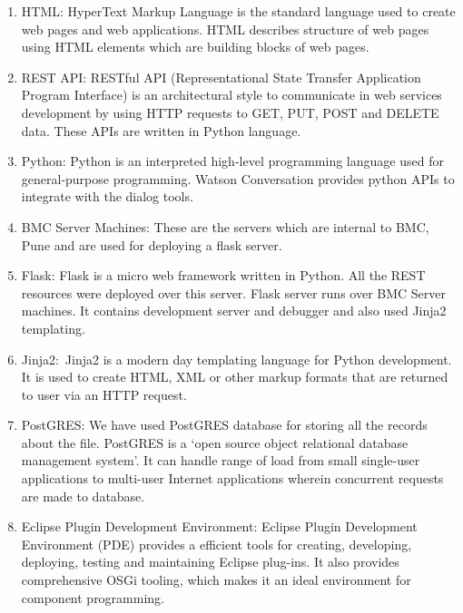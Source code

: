 \documentclass[oneside,a4paper,12pt]{book}
\begin{document}
\begin{enumerate}
	\item HTML: HyperText Markup Language is the standard language used to create web pages and web applications. HTML describes structure of web pages using HTML elements which are building blocks of web pages.\par

	\item REST API: RESTful API (Representational State Transfer Application Program Interface) is an architectural style to communicate in web services development by using HTTP requests to GET, PUT, POST and DELETE data. These APIs are written in Python language.\par

	\item Python: Python is an interpreted high-level programming language used for general-purpose programming. Watson Conversation provides python APIs to integrate with the dialog tools.\par

	\item BMC Server Machines: These are the servers which are internal to BMC, Pune and are used for deploying a flask server.\par

	\item Flask: Flask is a micro web framework written in Python. All the REST resources were deployed over this server. Flask server runs over BMC Server machines. It contains development server and debugger and also used Jinja2 templating.\par

	\item Jinja2:\ Jinja2 is a modern day templating language for Python development.  It is used to create HTML, XML or other markup formats that are returned to user via an HTTP request. \par

	\item PostGRES: We have used PostGRES database for storing all the records about the file. PostGRES is a ‘open source object relational database management system’. It can handle range of load from small single-user applications to multi-user Internet applications wherein concurrent requests are made to database. \par

	\item Eclipse Plugin Development Environment: Eclipse Plugin Development Environment (PDE) provides a efficient tools for creating, developing, deploying, testing and maintaining Eclipse plug-ins. It also provides comprehensive OSGi tooling, which makes it an ideal environment for component programming.
\end{enumerate}\par
\end{document}
